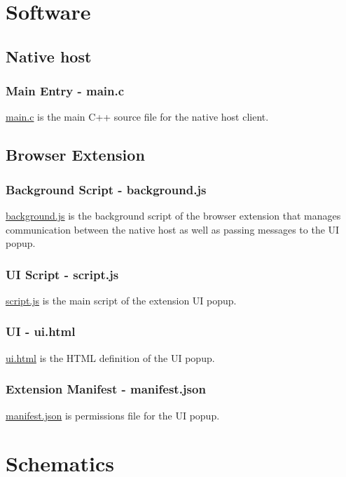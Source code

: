 \section{Software}
\subsection{Native host}
\subsubsection{Main Entry - main.c}
\label{sec:mainc}
\href{https://github.com/lunarjournal/EEE4022F/blob/main/Software/Nativehost/main.c}{main.c} is the main C++ source file for the native host client. 
\subsection{Browser Extension}
\label{sec:browser11}
\subsubsection{Background Script - background.js}
\label{sec:back}
\href{https://github.com/lunarjournal/EEE4022F/blob/main/Software/Browser\%20Extension/background.js}{background.js} is the background script of the browser extension that manages communication between the native host as well as passing messages to the UI popup.
\subsubsection{UI Script - script.js}
\href{https://github.com/lunarjournal/EEE4022F/blob/main/Software/Browser\%20Extension/script.js}{script.js} is the main script of the extension UI popup.
\subsubsection{UI - ui.html}
\href{https://github.com/lunarjournal/EEE4022F/blob/main/Software/Browser\%20Extension/ui.html}{ui.html} is the HTML definition of the UI popup.
\subsubsection{Extension Manifest - manifest.json}
\href{https://github.com/lunarjournal/EEE4022F/blob/main/Software/Browser\%20Extension/manifest.json}{manifest.json} is permissions file for the UI popup.

\section{Schematics}
